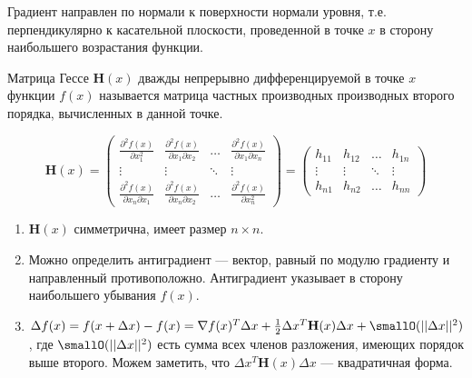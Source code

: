 \begin{remark}
    Градиент направлен по нормали к поверхности нормали уровня, т.е. перпендикулярно к касательной плоскости, проведенной в точке \(x\) в сторону наибольшего возрастания функции.
\end{remark}

\begin{definition}
    Матрица Гессе \(\mathbf H(x)\) дважды непрерывно дифференцируемой в точке \(x\) функции \(f(x)\) называется матрица частных производных производных второго порядка, вычисленных в данной точке.

    \[\mathbf H(x) = \begin{pmatrix}
            \frac{\partial^2 f(x)}{\partial x_1^2}            & \frac{\partial^2 f(x)}{\partial x_1 \partial x_2} & \dots  & \frac{\partial^2 f(x)}{\partial x_1 \partial x_n} \\
            \vdots                                            & \vdots                                            & \ddots & \vdots                                            \\
            \frac{\partial^2 f(x)}{\partial x_n \partial x_1} & \frac{\partial^2 f(x)}{\partial x_n\partial x_2}  & \dots  & \frac{\partial^2 f(x)}{\partial x_n^2}
        \end{pmatrix} = \begin{pmatrix}
            h_{11} & h_{12} & \dots  & h_{1n} \\
            \vdots & \vdots & \ddots & \vdots \\
            h_{n1} & h_{n2} & \dots  & h_{nn}
        \end{pmatrix}  \]
\end{definition}

\begin{enumerate}
    \item \(\mathbf H(x)\) симметрична, имеет размер \(n \times n\).
    \item Можно определить антиградиент --- вектор, равный по модулю градиенту и направленный противоположно. Антиградиент указывает в сторону наибольшего убывания \(f(x)\).
    \item \(\Delta f(x) = f(x + \Delta x) - f(x) = \nabla f(x)^T \Delta x + \frac{1}{2} \Delta x^T \mathbf H(x) \Delta x + \smallO(||\Delta x||^2)\), где \(\smallO(||\Delta x||^2)\) есть сумма всех членов разложения, имеющих порядок выше второго. Можем заметить, что \(\Delta x^T \mathbf H(x) \Delta x\) --- квадратичная форма.
\end{enumerate}

